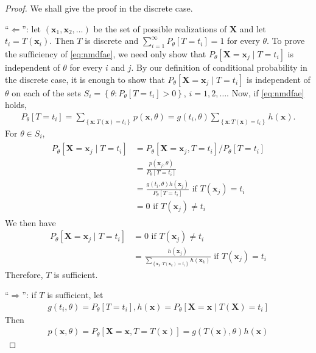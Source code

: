 \documentclass{article}
\begin{document}
\begin{proof}
We shall give the proof in the discrete case.

``$\Leftarrow$'':
 let $\left(\mathbf{x}_{1}, \mathbf{x}_{2}, \ldots\right)$ be the set of possible realizations of $\mathbf{X}$ and let $t_{i}=T\left(\mathbf{x}_{i}\right)$. Then $T$ is discrete and $\sum_{i=1}^{\infty} P_{\theta}\left[T=t_{i}\right]=1$ for every $\theta$. To prove the sufficiency of \cref{eq:nmdfae}, we need only show that $P_{\theta}\left[\mathbf{X}=\mathbf{x}_{j} \mid T=t_{i}\right]$ is independent of $\theta$ for every $i$ and $j$. By our definition of conditional probability in the discrete case, it is enough to show that $P_{\theta}\left[\mathbf{X}=\mathbf{x}_{j} \mid T=t_{i}\right]$ is independent of $\theta$ on each of the sets $S_{i}=\left\{\theta: P_{\theta}\left[T=t_{i}\right]>0\right\}$, $i=1,2, \ldots$. Now, if \cref{eq:nmdfae} holds,
\begin{align*}
P_{\theta}\left[T=t_{i}\right]=\sum_{\left\{\mathbf{x}: T(\mathbf{x})=t_{i}\right\}} p(\mathbf{x}, \theta)=g\left(t_{i}, \theta\right) \sum_{\left\{\mathbf{x}: T(\mathbf{x})=t_{i}\right\}} h(\mathbf{x}) .
\end{align*}
For $\theta \in S_{i}$,
\begin{align*}
\begin{aligned}
P_{\theta}\left[\mathbf{X}=\mathbf{x}_{j} \mid T=t_{i}\right] &=P_{\theta}\left[\mathbf{X}=\mathbf{x}_{j}, T=t_{i}\right] / P_{\theta}\left[T=t_{i}\right] \\
&=\frac{p\left(\mathbf{x}_{j}, \theta\right)}{P_{\theta}\left[T=t_{i}\right]} \\
&=\frac{g\left(t_{i}, \theta\right) h\left(\mathbf{x}_{j}\right)}{P_{\theta}\left[T=t_{i}\right]} \text { if } T\left(\mathbf{x}_{j}\right)=t_{i} \\
&=0 \text { if } T\left(\mathbf{x}_{j}\right) \neq t_{i}
\end{aligned}
\end{align*}
We then have 
\begin{align}
P_{\theta}\left[\mathbf{X}=\mathbf{x}_{j} \mid T=t_{i}\right] &=0 \text { if } T\left(\mathbf{x}_{j}\right) \neq t_{i} \\
&=\frac{h\left(\mathbf{x}_{j}\right)}{\sum_{\left\{\mathbf{x}_{k}: T\left(\mathbf{x}_{k}\right)=t_{i}\right\}} h\left(\mathbf{x}_{k}\right)} \text { if } T\left(\mathbf{x}_{j}\right)=t_{i} \label{eq:conditional_suff}
\end{align}
Therefore, $T$ is sufficient. 

``$\Rightarrow$'': if $T$ is sufficient, let
\begin{align*}
g\left(t_{i}, \theta\right)=P_{\theta}\left[T=t_{i}\right], h(\mathbf{x})=P_{\theta}\left[\mathbf{X}=\mathbf{x} \mid T(\mathbf{X})=t_{i}\right]
\end{align*}
Then
\begin{align*}
p(\mathbf{x}, \theta)=P_{\theta}[\mathbf{X}=\mathbf{x}, T=T(\mathbf{x})]=g(T(\mathbf{x}), \theta) h(\mathbf{x})
\end{align*}
\end{proof}
\end{document}
